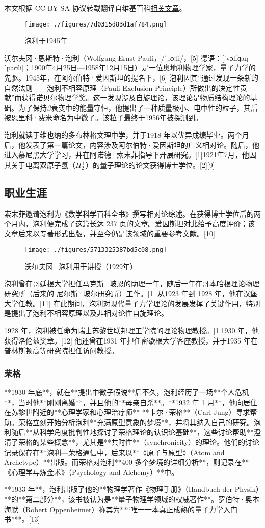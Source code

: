 
本文根据 CC-BY-SA 协议转载翻译自维基百科\href{https://en.wikipedia.org/wiki/Wolfgang_Pauli}{相关文章}。

\begin{figure}[ht]
\centering
\texttt{[image: ./figures/7d0315d83d1af784.png]}
\caption{泡利于1945年} \label{fig_Pauli2_1}
\end{figure}
沃尔夫冈·恩斯特·泡利（Wolfgang Ernst Pauli，/ˈpɔːli/，[5] 德语：[ˈvɔlfɡaŋ ˈpaʊli]；1900年4月25日—1958年12月15日）是一位奥地利物理学家，量子力学的先驱。1945年，在阿尔伯特·爱因斯坦的提名下，[6] 泡利因其“通过发现一条新的自然法则——泡利不相容原理（Pauli Exclusion Principle）所做出的决定性贡献”而获得诺贝尔物理学奖。这一发现涉及自旋理论，该理论是物质结构理论的基础。为了保持\(\beta\)衰变中的能量守恒，他提出了一种质量极小、电中性的粒子，其后被恩里科·费米命名为中微子。该粒子最终于1956年被探测到。

泡利就读于维也纳的多布林格文理中学，并于1918 年以优异成绩毕业。两个月后，他发表了第一篇论文，内容涉及阿尔伯特·爱因斯坦的广义相对论。随后，他进入慕尼黑大学学习，并在阿诺德·索末菲指导下开展研究。[1]1921年7月，他因其关于电离双原子氢（\(H_2^+\)）的量子理论的论文获得博士学位。[2][9]
\subsection{职业生涯}  
索末菲邀请泡利为《数学科学百科全书》撰写相对论综述。在获得博士学位后的两个月内，泡利便完成了这篇长达 237 页的文章。爱因斯坦对此给予高度评价；该文章后来以专著形式出版，并至今仍是该领域的重要参考文献。[10]
\begin{figure}[ht]
\centering
\texttt{[image: ./figures/5713325387bd5c08.png]}
\caption{沃尔夫冈·泡利用于讲授（1929年）} \label{fig_Pauli2_2}
\end{figure}
泡利曾在哥廷根大学担任马克斯·玻恩的助理一年，随后一年在哥本哈根理论物理研究所（后来的 尼尔斯·玻尔研究所）工作。[1] 从1923 年到 1928 年，他在汉堡大学任教。[11] 在此期间，泡利对现代量子力学理论的发展发挥了关键作用，特别是提出了泡利不相容原理以及非相对论性自旋理论。

1928 年，泡利被任命为瑞士苏黎世联邦理工学院的理论物理教授。[1]1930 年，他获得洛伦兹奖章。[12] 他还曾在1931 年担任密歇根大学客座教授，并于1935 年在普林斯顿高等研究院担任访问教授。
\subsubsection{荣格}  
**1930 年底**，就在**提出中微子假说**后不久，泡利经历了一场**个人危机**，当时他**刚刚离婚**，并且他的**母亲自杀**。**1932 年 1 月**，他向居住在苏黎世附近的**心理学家和心理治疗师** **卡尔·荣格**（Carl Jung）寻求帮助。荣格立刻开始分析泡利**充满原型意象的梦境**，并将其纳入自己的研究。泡利随后**从科学角度批判性地探讨了荣格理论的认识论基础**，这些讨论帮助**澄清了荣格的某些概念**，尤其是**共时性**（synchronicity）的理论。他们的讨论记录保存在**泡利—荣格通信中，后来以**《原子与原型》（Atom and Archetype）**出版。而荣格对泡利**400 多个梦境的详细分析**，则记录在**《心理学与炼金术》（Psychology and Alchemy）**中。

**1933 年**，泡利出版了他的**物理学著作《物理手册》（Handbuch der Physik）**的**第二部分**，该书被认为是**量子物理学领域的权威著作**。罗伯特·奥本海默（Robert Oppenheimer）称其为**“唯一一本真正成熟的量子力学入门书”**。[13]